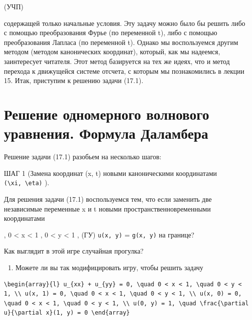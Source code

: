 \documentclass[
  ukrainian,
]{article}
\providecommand{\tightlist}{%
  \setlength{\itemsep}{0pt}\setlength{\parskip}{0pt}}
\begin{document}
(УЧП)

содержащей только начальные условия. Эту задачу можно было бы решить
либо с помощью преобразования Фурье (по переменной t), либо с помощью
преобразования Лапласа (по переменной t). Однако мы воспользуемся другим
методом (методом канонических координат), который, как мы надеемся,
заинтересует читателя. Этот метод базируется на тех же идеях, что и
метод перехода к движущейся системе отсчета, с которым мы познакомились
в лекции 15. Итак, приступим к решению задачи (17.1).

\section{Решение одномерного волнового уравнения. Формула
Даламбера}\label{ux440ux435ux448ux435ux43dux438ux435-ux43eux434ux43dux43eux43cux435ux440ux43dux43eux433ux43e-ux432ux43eux43bux43dux43eux432ux43eux433ux43e-ux443ux440ux430ux432ux43dux435ux43dux438ux44f.-ux444ux43eux440ux43cux443ux43bux430-ux434ux430ux43bux430ux43cux431ux435ux440ux430}

Решение задачи (17.1) разобьем на несколько шагов:

ШАГ 1 (Замена координат (x, t) новыми каноническими координатами
\texttt{(\textbackslash{}xi,\ \textbackslash{}eta)} ).

Для решения задачи (17.1) воспользуемся тем, что если заменить две
независимые переменные x и t новыми пространственновременными
координатами

, 0 \textless{} x \textless{} 1 , 0 \textless{} y \textless{} 1 , (ГУ)
\texttt{u(x,\ y)} = \texttt{g(x,\ y)} на границе?

Как выглядит в этой игре случайная прогулка?

\begin{enumerate}
\def\labelenumi{\arabic{enumi}.}
\setcounter{enumi}{3}
\tightlist
\item
  Можете ли вы так модифицировать игру, чтобы решить задачу
\end{enumerate}

\begin{verbatim}
\begin{array}{l} u_{xx} + u_{yy} = 0, \quad 0 < x < 1, \quad 0 < y < 1, \\ u(x, 1) = 0, \quad 0 < x < 1, \quad 0 < y < 1, \\ u(x, 0) = 0, \quad 0 < x < 1, \quad 0 < y < 1, \\ u(0, y) = 1, \quad \frac{\partial u}{\partial x}(1, y) = 0 \end{array}
\end{verbatim}
\end{document}
